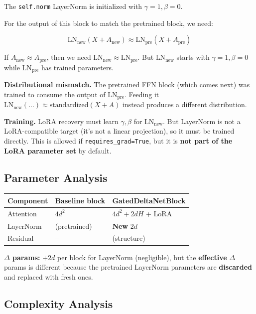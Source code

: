 The \texttt{self.norm} LayerNorm is initialized with $\gamma = 1, \beta = 0$.

For the output of this block to match the pretrained block, we need:

\[
\text{LN}_\text{new}(X + A_\text{new}) \approx \text{LN}_\text{pre}(X + A_\text{pre})
\tag{4.1}
\]

If $A_\text{new} \approx A_\text{pre}$, then we need 
$\text{LN}_\text{new} \approx \text{LN}_\text{pre}$. But 
$\text{LN}_\text{new}$ starts with $\gamma = 1, \beta = 0$ while 
$\text{LN}_\text{pre}$ has trained parameters.

\textbf{Distributional mismatch.} The pretrained FFN block (which comes next) was 
trained to consume the output of $\text{LN}_\text{pre}$. Feeding it 
$\text{LN}_\text{new}(...) \approx \text{standardized}(X + A)$ instead 
produces a different distribution.

\textbf{Training.} LoRA recovery must learn $\gamma, \beta$ for $\text{LN}_\text{new}$. 
But LayerNorm is not a LoRA-compatible target (it's not a linear projection), 
so it must be trained directly. This is allowed if \texttt{requires\_grad=True}, but 
it is \textbf{not part of the LoRA parameter set} by default.

\subsection{Parameter Analysis}

\begin{table}[H]
\centering
\small
\begin{tabular}{lll}
\toprule
\textbf{Component} & \textbf{Baseline block} & \textbf{GatedDeltaNetBlock} \\
\midrule
Attention & $4 d^2$ & $4 d^2 + 2 d H$ + LoRA \\
LayerNorm & (pretrained) & \textbf{New} $2d$ \\
Residual & -- & (structure) \\
\bottomrule
\end{tabular}
\end{table}

\textbf{$\Delta$ params:} $+2d$ per block for LayerNorm (negligible), but the \textbf{effective} 
$\Delta$ params is different because the pretrained LayerNorm parameters are 
\textbf{discarded} and replaced with fresh ones.

\subsection{Complexity Analysis}

